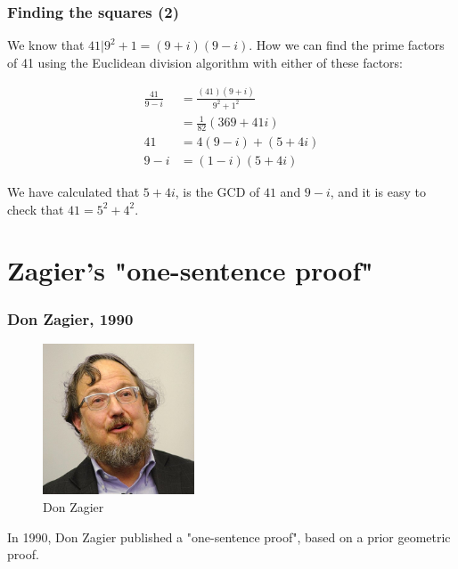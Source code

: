 \documentclass{beamer}
\begin{document}
\begin{frame}
	\frametitle{Finding the squares (2)}

	We know that $41|9^2+1 = (9+i)(9-i)$. How we can find the prime factors of 41
	using the Euclidean division algorithm with either of these factors:

	\begin{align*}
		\frac{41}{9-i} &= \frac{(41)(9+i)}{9^2+1^2} \\
		 &= \frac{1}{82}(369 + 41i) \\
		41  &= 4(9-i) + (5+4i) \\
		9-i &= (1-i)(5+4i)
	\end{align*}

	We have calculated that $5+4i$, is the GCD of $41$ and $9-i$, and it is easy to
	check that $41 = 5^2 + 4^2$.

\end{frame}

\section{Zagier's "one-sentence proof"}

\begin{frame}
        \frametitle{Don Zagier, 1990}
        \begin{figure}
                \includegraphics[width=0.4\textwidth]{480px-DonZagier-talking.jpeg}
                \caption*{Don Zagier}
                \label{fig:zagier1}
        \end{figure}

	In 1990, Don Zagier published a "one-sentence proof", based on a prior geometric proof.
\end{frame}
\end{document}
